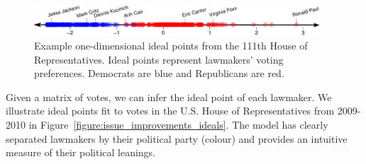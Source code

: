 
\begin{figure}
  \center
  \includegraphics[width=0.95\textwidth]{chapter_spatial_voting_with_text/figures/3393_example_ideal_points_final.pdf}
  \caption{Example one-dimensional ideal points from the 111th House
  of Representatives.  Ideal points represent lawmakers' voting
  preferences. Democrats are blue and Republicans are red.}
  \label{figure:example_ideal_points}
\end{figure}
Given a matrix of votes, we can infer the ideal point of each
lawmaker.  We illustrate ideal points fit to votes in the U.S. House
of Representatives from 2009-2010 in
Figure~\ref{figure:issue_improvements_ideals}.  The model has clearly
separated lawmakers by their political party (colour) and provides an
intuitive measure of their political leanings.






